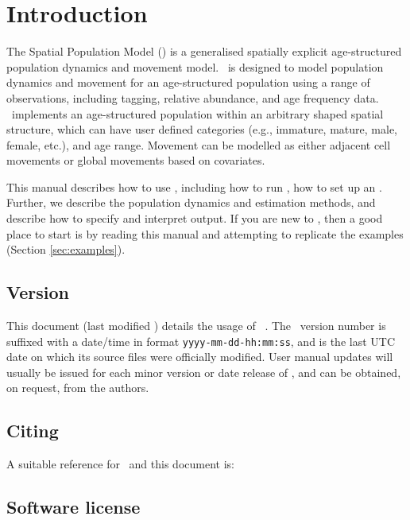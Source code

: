 \section{Introduction\label{sec:Introduction}}

The Spatial Population Model (\SPM) is a generalised spatially explicit age-structured population dynamics and movement model. \SPM\ is designed to model population dynamics and movement for an age-structured population using a range of observations, including tagging, relative abundance, and age frequency data. \SPM\ implements an age-structured population within an arbitrary shaped spatial structure, which can have user defined categories (e.g., immature, mature, male, female, etc.), and age range. Movement can be modelled as either adjacent cell movements or global movements based on covariates.

This manual describes how to use \SPM, including how to run \SPM, how to set up an \config. Further, we describe the population dynamics and estimation methods, and describe how to specify and interpret output. If you are new to \SPM, then a good place to start is by reading this manual and attempting to replicate the examples (Section \ref{sec:examples}).

\subsection{Version\label{sec:version}}

This document (last modified \DocVer) details the usage of \SPM\ \VER. The \SPM\ version number is suffixed with a date/time in format \texttt{yyyy-mm-dd-hh:mm:ss}, and is the last UTC date on which its source files were officially modified. User manual updates will usually be issued for each minor version or date release of \SPM, and can be obtained, on request, from the authors.

\subsection{Citing \SPM}

A suitable reference for \SPM\ and this document is:

\ManualRef{}

\subsection{Software license}

